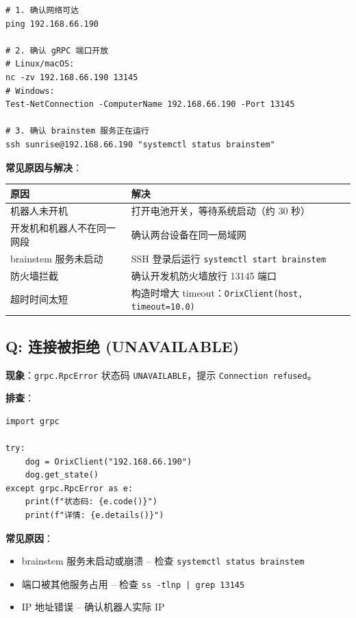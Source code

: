 \documentclass[a4paper,11pt,openany]{book}
\begin{document}
\begin{lstlisting}[style=bash]
# 1. 确认网络可达
ping 192.168.66.190

# 2. 确认 gRPC 端口开放
# Linux/macOS:
nc -zv 192.168.66.190 13145
# Windows:
Test-NetConnection -ComputerName 192.168.66.190 -Port 13145

# 3. 确认 brainstem 服务正在运行
ssh sunrise@192.168.66.190 "systemctl status brainstem"
\end{lstlisting}

\noindent\textbf{常见原因与解决}：

\begin{longtable}{ll}
\toprule
原因 & 解决 \\
\midrule
\endhead
机器人未开机 & 打开电池开关，等待系统启动（约 30 秒） \\
开发机和机器人不在同一网段 & 确认两台设备在同一局域网 \\
brainstem 服务未启动 & SSH 登录后运行 \texttt{systemctl start brainstem} \\
防火墙拦截 & 确认开发机防火墙放行 13145 端口 \\
超时时间太短 & 构造时增大 timeout：\texttt{OrixClient(host, timeout=10.0)} \\
\bottomrule
\end{longtable}

\subsection{Q: 连接被拒绝 (UNAVAILABLE)}

\noindent\textbf{现象}：\texttt{grpc.RpcError} 状态码 \texttt{UNAVAILABLE}，提示 \texttt{Connection refused}。

\noindent\textbf{排查}：

\begin{lstlisting}[style=python]
import grpc

try:
    dog = OrixClient("192.168.66.190")
    dog.get_state()
except grpc.RpcError as e:
    print(f"状态码: {e.code()}")
    print(f"详情: {e.details()}")
\end{lstlisting}

\noindent\textbf{常见原因}：
\begin{itemize}[nosep]
  \item brainstem 服务未启动或崩溃 -- 检查 \texttt{systemctl status brainstem}
  \item 端口被其他服务占用 -- 检查 \texttt{ss -tlnp | grep 13145}
  \item IP 地址错误 -- 确认机器人实际 IP
\end{itemize}
\end{document}
